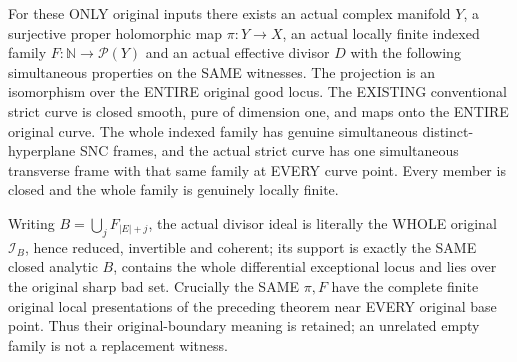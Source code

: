 \begin{theorem}
\label{hir:sharp-actual-original-global-sharp-endpoint-existence}
\leanok
For these ONLY original inputs there exists an actual complex manifold
$Y$, a surjective proper holomorphic map $\pi:Y\to X$, an actual locally
finite indexed family $F:\mathbb N\to\mathcal P(Y)$ and an actual effective
divisor $D$ with the following simultaneous properties on the SAME
witnesses. The projection is an isomorphism over the ENTIRE original
good locus. The EXISTING conventional strict curve is closed smooth,
pure of dimension one, and maps onto the ENTIRE original curve.
The whole indexed family has genuine simultaneous distinct-hyperplane
SNC frames, and the actual strict curve has one simultaneous transverse
frame with that same family at EVERY curve point. Every member is
closed and the whole family is genuinely locally finite.

Writing $B=\bigcup_jF_{|E|+j}$, the actual divisor ideal is literally
the WHOLE original $\mathcal I_B$, hence reduced, invertible and coherent;
its support is exactly the SAME closed analytic $B$, contains the whole
differential exceptional locus and lies over the original sharp bad
set. Crucially the SAME $\pi,F$ have the complete finite original local
presentations of the preceding theorem near EVERY original base point.
Thus their original-boundary meaning is retained; an unrelated empty
family is not a replacement witness.
\end{theorem}
